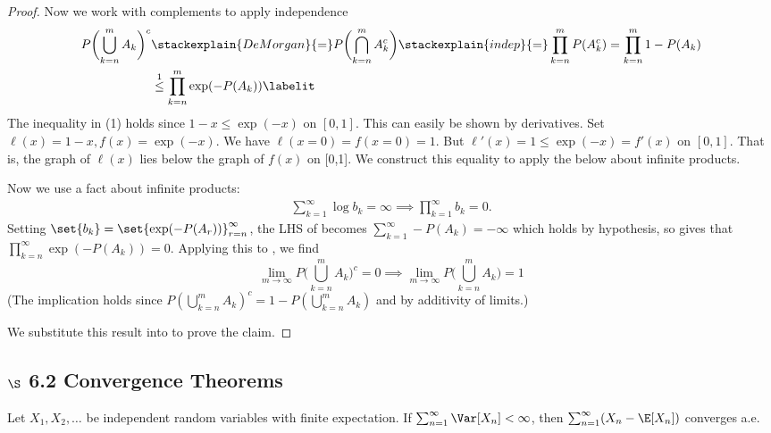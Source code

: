 \documentclass{article} %
\begin{document}
\begin{proof}
Now we work with complements to apply independence 
\begin{align*}
 P\bigg( {\bigcup_{k=n}^{m}  A_k}  \bigg)^c & \stackexplain{De Morgan}{=}  P\bigg( {\bigcap_{k=n}^{m}  A_k^c}  \bigg) \stackexplain{indep}{=} \prod_{k=n}^m P(A_k^c) = \prod_{k=n}^m 1 - P(A_k) \\
 & \stackrel{1}{\leq} \prod_{k=n}^m \exp(-P(A_k)) 
 \labelit \label{eqn:intermediate_equation_for_second_borel_cantelli_lemma}	
\end{align*}
%
{\scriptsize The inequality in (1) holds since $1-x \leq \exp(-x)$ on $[0,1]$.  This can easily be shown by derivatives. Set $\ell(x)=1-x, f(x) =\exp(-x)$. We have $\ell(x=0)=f(x=0)=1$. But $\ell'(x) = 1 \leq \exp(-x) = f'(x)$ on $[0,1]$. That is, the graph of $\ell(x)$ lies below the graph of $f(x)$ on [0,1]. We construct this equality to apply the below about infinite products.}

Now we use a fact about infinite products:
\begin{align}
\sum_{k=1}^\infty \log b_k = \infty \implies \prod_{k=1}^\infty b_k = 0.
\label{eqn:fact_about_infinite_products}
\end{align}
Setting $\set{b_k} = \set{\exp(-P(A_r))}_{r=n}^\infty$, the LHS of   becomes $\sum_{k=1}^\infty -P(A_k) = -\infty$ which holds by hypothesis, so  gives that $\prod_{k=n}^\infty \exp(-P(A_k))=0$.  Applying this to , we find 
\[ \lim_{m \to \infty} P\bigg( {\bigcup_{k=n}^{m}  A_k}  \bigg)^c  =  0 \implies \lim_{m \to \infty} P\bigg( {\bigcup_{k=n}^{m}  A_k}\bigg)  =  1\]
{\scriptsize (The implication holds since $P( {\bigcup_{k=n}^{m}  A_k})^c = 1-P( {\bigcup_{k=n}^{m}  A_k})$ and by additivity of limits.)}

We substitute this result into  to prove the claim.
\end{proof}


\subsection{$\S$ 6.2 Convergence Theorems}

\begin{theorem}
Let $X_1, X_2, \hdots$ be independent random variables with finite expectation.  If $\sum_{n=1}^\infty \Var[X_n] < \infty$, then $\sum_{n=1}^\infty (X_n - \E[X_n])$ converges a.e.
\label{thm:if_a_sequence_of_RVs_has_a_finite_sum_of_variances_then_the_series_of_deviations_from_expected_value_converges_almost_everywhere}
\end{theorem}
\end{document}
